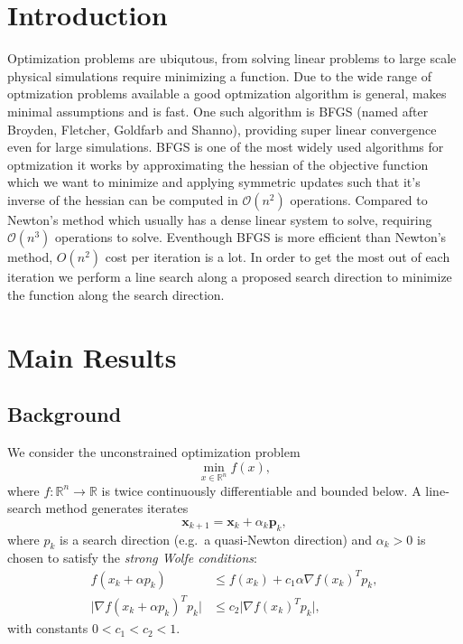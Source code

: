 \documentclass[12pt]{report}
\begin{document}
\chapter{Introduction}
Optimization problems are ubiqutous, from solving linear problems to large scale physical simulations require minimizing a function. Due to the wide range of optmization problems available a good optmization algorithm is general, makes minimal assumptions and is fast. One such algorithm is BFGS (named after Broyden, Fletcher, Goldfarb and Shanno), providing super linear convergence even for large simulations.
BFGS is one of the most widely used algorithms for optmization it works by approximating the hessian of the objective function which we want to minimize and applying symmetric updates such that it's inverse of the hessian can be computed in $\mathcal{O}(n^2)$ operations. Compared to Newton's method which usually has a dense linear system to solve, requiring $\mathcal O(n^3)$ operations to solve.
Eventhough BFGS is more efficient than Newton's method, $O(n^2)$ cost per iteration is a lot. In order to get the most out of each iteration we perform a line search along a proposed search direction to minimize the function along the search direction.


\chapter{Main Results}

\section{Background}
We consider the unconstrained optimization problem
\[
	\min_{x\in\mathbb{R}^n} f(x),
\]
where $f:\mathbb{R}^n\to\mathbb{R}$ is twice continuously differentiable and bounded below.
A line‐search method generates iterates
\[
	\bm x_{k+1} = \bm x_k + \alpha_k \bm p_k,
\]
where $p_k$ is a search direction (e.g.\ a quasi‐Newton direction) and $\alpha_k>0$ is chosen to satisfy the \emph{strong Wolfe conditions}:
\begin{align}
	f(x_k + \alpha p_k)                          & \le f(x_k) + c_1 \alpha \nabla f(x_k)^T p_k, \label{eq:sufficient‐decrease} \\
	\bigl|\nabla f(x_k + \alpha p_k)^T p_k\bigr| & \le c_2 \bigl|\nabla f(x_k)^T p_k\bigr|,
\end{align}
with constants $0 < c_1 < c_2 < 1$.
\end{document}
